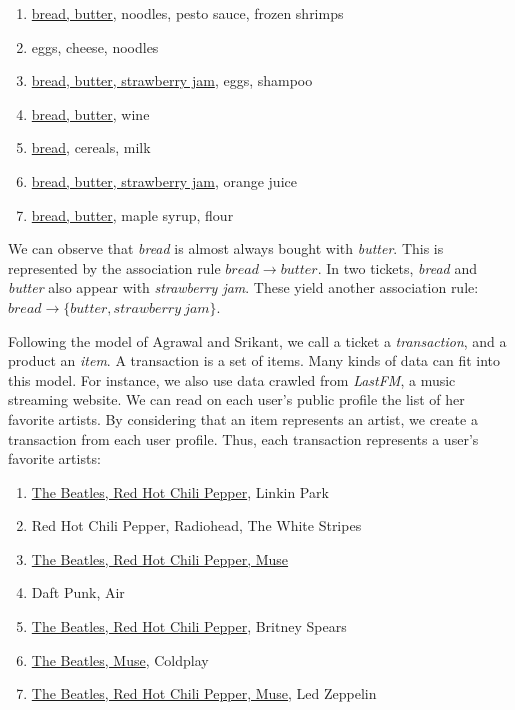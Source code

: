 {
\renewcommand{\labelenumi}{Ticket \theenumi:}
\begin{enumerate}
  \leftskip .52in
  \item \underline{bread, butter}, noodles, pesto sauce, frozen shrimps
  \item eggs, cheese, noodles
  \item \underline{bread, butter, strawberry jam}, eggs, shampoo
  \item \underline{bread, butter}, wine
  \item \underline{bread}, cereals, milk
  \item \underline{bread, butter, strawberry jam}, orange juice
  \item \underline{bread, butter}, maple syrup, flour
\end{enumerate}
}

We can observe that {\em bread} is almost always bought with {\em butter}.
This is represented by the association rule $\mathit{bread} \rightarrow \mathit{butter}$.
In two tickets,
{\em bread} and {\em butter} also appear with {\em strawberry jam}.
These yield another association rule:
$\mathit{bread} \rightarrow \{\mathit{butter}, \mathit{strawberry\ jam}\}$.

Following the model of Agrawal and Srikant, we call a ticket a {\em transaction},
and a product an {\em item}. A transaction is a set of items.
Many kinds of data can fit into this model.
For instance, we also use data crawled from {\em LastFM}, a music streaming website.
We can read on each user's public profile the list of her favorite artists.
By considering that an item represents an artist,
we create a transaction from each user profile.
Thus, each transaction represents a user's favorite artists:
{
\renewcommand{\labelenumi}{User \theenumi:}
\begin{enumerate}
  \leftskip .4in
  \item \underline{The Beatles, Red Hot Chili Pepper}, Linkin Park
  \item Red Hot Chili Pepper, Radiohead, The White Stripes
  \item \underline{The Beatles, Red Hot Chili Pepper, Muse}
  \item Daft Punk, Air
  \item \underline{The Beatles, Red Hot Chili Pepper}, Britney Spears
  \item \underline{The Beatles, Muse}, Coldplay
  \item \underline{The Beatles, Red Hot Chili Pepper, Muse}, Led Zeppelin
\end{enumerate}
}

